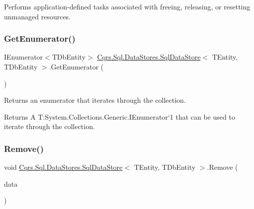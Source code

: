 Performs application-\/defined tasks associated with freeing, releasing, or resetting unmanaged resources. 

\mbox{\label{classCqrs_1_1Sql_1_1DataStores_1_1SqlDataStore_a2114238ed13dfe1beaf1b096d3e36c6a_a2114238ed13dfe1beaf1b096d3e36c6a}} 
\subsubsection{\texorpdfstring{Get\+Enumerator()}{GetEnumerator()}}
{\footnotesize\ttfamily I\+Enumerator$<$T\+Db\+Entity$>$ \hyperlink{classCqrs_1_1Sql_1_1DataStores_1_1SqlDataStore}{Cqrs.\+Sql.\+Data\+Stores.\+Sql\+Data\+Store}$<$ T\+Entity, T\+Db\+Entity $>$.Get\+Enumerator (\begin{DoxyParamCaption}{ }\end{DoxyParamCaption})}



Returns an enumerator that iterates through the collection. 

\begin{DoxyReturn}{Returns}
A T\+:\+System.\+Collections.\+Generic.\+I\+Enumerator`1 that can be used to iterate through the collection. 
\end{DoxyReturn}
\mbox{\label{classCqrs_1_1Sql_1_1DataStores_1_1SqlDataStore_ada15bdc873b3e4be8ff9a734d84562fb_ada15bdc873b3e4be8ff9a734d84562fb}} 
\subsubsection{\texorpdfstring{Remove()}{Remove()}}
{\footnotesize\ttfamily void \hyperlink{classCqrs_1_1Sql_1_1DataStores_1_1SqlDataStore}{Cqrs.\+Sql.\+Data\+Stores.\+Sql\+Data\+Store}$<$ T\+Entity, T\+Db\+Entity $>$.Remove (\begin{DoxyParamCaption}\item[{T\+Entity}]{data }\end{DoxyParamCaption})}

